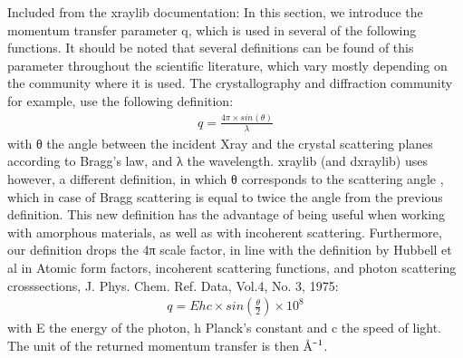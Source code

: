 \documentclass[letterpaper,10pt,english,openany,oneside]{sphinxmanual}
\begin{document}
\sphinxAtStartPar
Included from the xraylib documentation:
In this section, we introduce the momentum transfer parameter q, which is used
in several of the following functions. It should be noted that several
definitions can be found of this parameter throughout the scientific
literature, which vary mostly depending on the community where it is used. The
crystallography and diffraction community for example, use the following
definition:
\begin{equation*}
\begin{split}q = \frac{4\pi \times sin(\theta)}{\lambda}\end{split}
\end{equation*}
\sphinxAtStartPar
with θ the angle between the incident X\sphinxhyphen{}ray and the crystal scattering planes
according to Bragg’s law, and λ the wavelength. xraylib (and dxraylib) uses
however, a different definition, in which θ corresponds to the scattering angle
, which in case of Bragg scattering is equal to twice the angle from the
previous definition. This new definition has the advantage of being useful
when working with amorphous materials, as well as with incoherent scattering.
Furthermore, our definition drops the 4π scale factor, in line with the
definition by Hubbell et al in Atomic form factors, incoherent scattering
functions, and photon scattering cross\sphinxhyphen{}sections, J. Phys. Chem. Ref. Data,
Vol.4, No. 3, 1975:
\begin{equation*}
\begin{split}q = Ehc \times sin(\frac{\theta}{2}) \times 10^{8}\end{split}
\end{equation*}
\sphinxAtStartPar
with E the energy of the photon, h Planck’s constant and c the speed of light.
The unit of the returned momentum transfer is then Å⁻\(\sp{\text{1}}\).

\begin{DUlineblock}{0em}
\item[] 
\end{DUlineblock}
\end{document}
